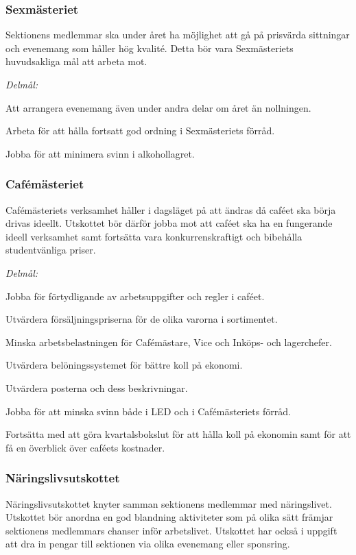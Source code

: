 \documentclass[10pt]{article}
\begin{document}
\subsubsection*{Sexmästeriet}
Sektionens medlemmar ska under året ha möjlighet att gå på prisvärda sittningar och evenemang som håller hög kvalité. Detta bör vara Sexmästeriets huvudsakliga mål att arbeta mot.

\emph{Delmål:}
\begin{dashlist}
    \item Att arrangera evenemang även under andra delar om året än nollningen.
    \item Arbeta för att hålla fortsatt god ordning i Sexmästeriets förråd.
    \item Jobba för att minimera svinn i alkohollagret.
\end{dashlist}

\newpage

\subsubsection*{Cafémästeriet}
Cafémästeriets verksamhet håller i dagsläget på att ändras då caféet ska börja drivas ideellt. Utskottet bör därför jobba mot att caféet ska ha en fungerande ideell verksamhet samt fortsätta vara konkurrenskraftigt och bibehålla studentvänliga priser.

\emph{Delmål:}
\begin{dashlist}
    \item Jobba för förtydligande av arbetsuppgifter och regler i caféet.
    \item Utvärdera försäljningspriserna för de olika varorna i sortimentet.
    \item Minska arbetsbelastningen för Cafémästare, Vice och Inköps- och lagerchefer.
    \item Utvärdera belöningssystemet för bättre koll på ekonomi.
    \item Utvärdera posterna och dess beskrivningar.
    \item Jobba för att minska svinn både i LED och i Cafémästeriets förråd.
    \item Fortsätta med att göra kvartalsbokslut för att hålla koll på ekonomin samt för att få en överblick över caféets kostnader.
\end{dashlist}

\subsubsection*{Näringslivsutskottet}
Näringslivsutskottet knyter samman sektionens medlemmar med näringslivet. Utskottet bör anordna en god blandning aktiviteter som på olika sätt främjar sektionens medlemmars chanser inför arbetslivet. Utskottet har också i uppgift att dra in pengar till sektionen via olika evenemang eller sponsring.
\end{document}

